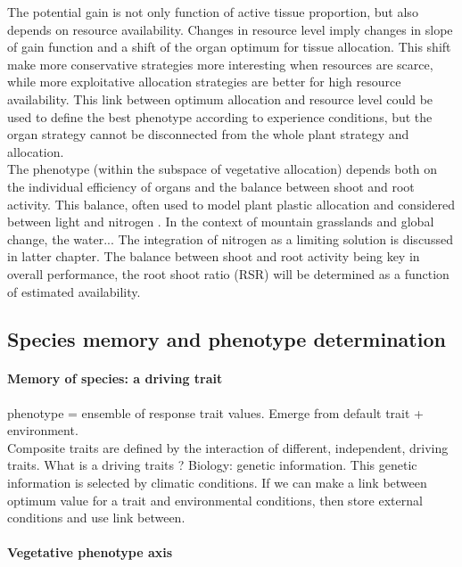 The potential gain is not only function of active tissue proportion, but also depends on resource availability. Changes in resource level imply changes in slope of gain function and a shift of the organ optimum for tissue allocation. This shift make more conservative strategies more interesting when resources are scarce, while more exploitative allocation strategies are better for high resource availability. This link between optimum allocation and resource level could be used to define the best phenotype according to experience conditions, but the organ strategy cannot be disconnected from the whole plant strategy and allocation.\\

The phenotype (within the subspace of vegetative allocation) depends both on the individual efficiency of organs and the balance between shoot and root activity. This balance, often used to model plant plastic allocation and considered between light and nitrogen \cite{lohier, soussana}. In the context of mountain grasslands and global change, the water... The integration of nitrogen as a limiting solution is discussed in latter chapter. The balance between shoot and root activity being key in overall performance, the root shoot ratio (RSR) will be determined as a function of estimated availability.


\subsection{Species memory and phenotype determination}\label{subsection:memory}

\paragraph{Memory of species: a driving trait}

phenotype = ensemble of response trait values. Emerge from default trait + environment.\\
Composite traits are defined by the interaction of different, independent, driving traits. What is a driving traits ? Biology: genetic information. This genetic information is selected by climatic conditions. If we can make a link between optimum value for a trait and environmental conditions, then store external conditions and use link between.\\


\paragraph{Vegetative phenotype axis}

